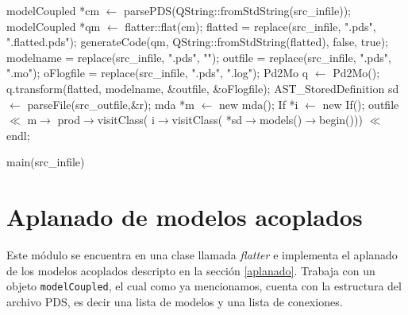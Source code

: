 \begin{algorithm}[H]
\begin{algorithmic}[1]
\State modelCoupled *cm $\gets$ parsePDS(QString::fromStdString(src\_infile));
\State modelCoupled *qm $\gets$ flatter::flat(cm);
\State flatted = replace(src\_infile, ".pds", ".flatted.pds");
\State generateCode(qm, QString::fromStdString(flatted), false, true);
\State modelname = replace(src\_infile, ".pds", "");
\State outfile = replace(src\_infile, ".pds", ".mo");
\State oFlogfile = replace(src\_infile, ".pds", ".log");
\State Pd2Mo q $\gets$ Pd2Mo();
\State q.transform(flatted, modelname, \&outfile, \&oFlogfile);
\State AST\_StoredDefinition sd $\gets$ parseFile(src\_outfile,\&r);
\State mda *m $\gets$ new mda();
\State If *i $\gets$ new If();
\State outfile $\ll$ m$\rightarrow$ 
		{prod$\rightarrow$visitClass( i$\rightarrow$visitClass( 
			*sd$\rightarrow$models()$\rightarrow$begin()))} $\ll$ endl;

\end{algorithmic}
\caption{main(src\_infile)}\label{proc:main}
\end{algorithm}

\section{Aplanado de modelos acoplados} 
Este módulo se encuentra en una clase llamada \emph{flatter} e implementa el aplanado de los modelos acoplados descripto en la sección \ref{aplanado}. 
Trabaja con un objeto \texttt{modelCoupled}, el cual como ya mencionamos, cuenta con la estructura del archivo PDS, es decir una lista de modelos y una lista de conexiones.
 
